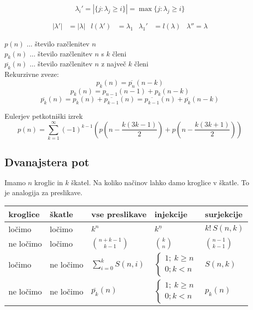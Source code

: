 \documentclass[11pt,a4paper]{article}
\begin{document}
\[\lambda_i' = |\{j:\lambda_j \geq i\}| = \max\{j: \lambda_j \geq i\}\]

\begin{align*}
    |\lambda'| &= |\lambda| & l(\lambda') &= \lambda_1 & \lambda_1' &= l(\lambda) & \lambda'' = \lambda
\end{align*}

$p(n)$ $\dots$ število razčlenitev $n$\\
$p_k(n)$ $\dots$ število razčlenitev $n$ s $k$ členi\\
$\overline{p_k}(n)$ $\dots$ število razčlenitev $n$ z največ $k$ členi\\

Rekurzivne zveze:
\[p_k(n) = \overline{p_n}(n-k)\]
\[p_k(n) = p_{n-1}(n-1) + p_k(n-k)\]
\[\overline{p_k}(n) = p_k(n) + \overline{p_{k-1}}(n) = \overline{p_{k-1}}(n) + \overline{p_k}(n-k)\]

Eulerjev petkotniški izrek
\[p(n) = \sum_{k=1}^{\infty} (-1)^{k-1} \left( p \left( n - \frac{k(3k-1)}{2}\right) + p \left( n - \frac{k(3k+1)}{2}\right)\right)\]


\subsection*{Dvanajstera pot}
Imamo $n$ kroglic in $k$ škatel. Na koliko načinov lahko damo kroglice v škatle. To je analogija za preslikave.
\begin{center}
\begin{tabular}{|l|l||l|l|l|}
    \hline
kroglice    & škatle    & \textbf{vse preslikave} & \textbf{injekcije}                              & \textbf{surjekcije} \\ \hline
ločimo      & ločimo    & $k^n$                 & $k^{\underline{n}}$                               & $k!\,S(n,k)$ \\ \hline
ne ločimo   & ločimo    & $\binom{n+k-1}{k-1}$  & $\binom{k}{n}$                                    & $\binom{n-1}{k-1}$ \\ \hline
ločimo      & ne ločimo & $\sum_{i=0}^k S(n,i)$ & $\begin{cases}1;\ k \geq n\\ 0; k < n\end{cases}$ & $S(n,k)$ \\ \hline
ne ločimo   & ne ločimo & $\overline{p_k}(n)$   & $\begin{cases}1;\ k \geq n\\ 0; k < n\end{cases}$ & $p_k(n)$ \\ \hline
\end{tabular}
\end{center}
\end{document}
